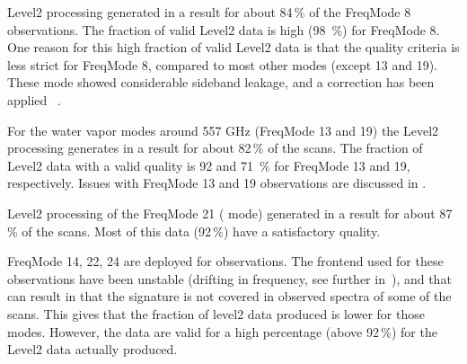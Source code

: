 Level2 processing generated in a result for about 84\,\%
of the FreqMode 8 observations. The fraction of valid Level2
data is high (98 \,\%) for FreqMode 8.
One reason for this high fraction of valid Level2 data
is that the quality criteria is less strict for FreqMode 8,
compared to most other modes (except 13 and 19).
These mode showed considerable sideband leakage, and a correction
has been applied ~\cite{pver}. 


% 

For the water vapor modes around 557 GHz (FreqMode
13 and 19) the Level2 processing generates in a result for
about 82\,\% of the scans. The fraction of Level2 
data with a valid quality is 92 and 71 \,\% for FreqMode
13 and 19, respectively.
Issues with FreqMode 13 and 19 observations are discussed
in \cite{pver}.
 
Level2 processing of the FreqMode 21 ( mode)
generated in a result for about 87\,\% of the scans.
Most of this data (92\,\%) have a satisfactory quality.

FreqMode 14, 22, 24 are deployed for  observations.
The frontend used for these observations have been unstable
(drifting in frequency, see further in~\citet{grieco:recov:20}),
and that can result in that the 
 signature is not covered in observed spectra 
of some of the scans. This gives that the fraction of
level2 data produced is lower for those modes.
However, the data are valid for a high percentage
(above 92\,\%) for the Level2 data actually produced.  
 

